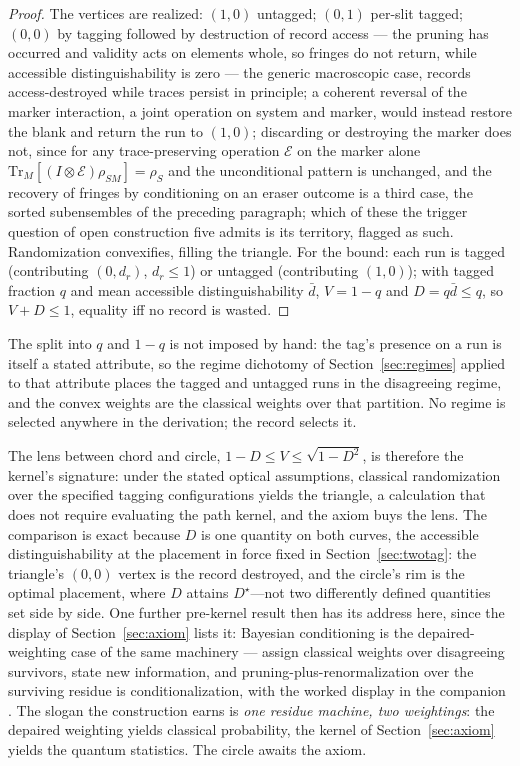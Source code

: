 \begin{proof}
The vertices are realized: $(1,0)$ untagged; $(0,1)$ per-slit tagged; $(0,0)$ by tagging followed by destruction of record access --- the pruning has occurred and validity acts on elements whole, so fringes do not return, while accessible distinguishability is zero --- the generic macroscopic case, records access-destroyed while traces persist in principle; a coherent reversal of the marker interaction, a joint operation on system and marker, would instead restore the blank and return the run to $(1,0)$; discarding or destroying the marker does not, since for any trace-preserving operation $\mathcal{E}$ on the marker alone $\mathrm{Tr}_M[(I \otimes \mathcal{E})\rho_{SM}] = \rho_S$ and the unconditional pattern is unchanged, and the recovery of fringes by conditioning on an eraser outcome is a third case, the sorted subensembles of the preceding paragraph; which of these the trigger question of open construction five admits is its territory, flagged as such. Randomization convexifies, filling the triangle. For the bound: each run is tagged (contributing $(0, d_r)$, $d_r \le 1$) or untagged (contributing $(1, 0)$); with tagged fraction $q$ and mean accessible distinguishability $\bar d$, $V = 1 - q$ and $D = q\bar d \le q$, so $V + D \le 1$, equality iff no record is wasted.
\end{proof}

\noindent The split into $q$ and $1-q$ is not imposed by hand: the tag's presence on a run is itself a stated attribute, so the regime dichotomy of Section~\ref{sec:regimes} applied to that attribute places the tagged and untagged runs in the disagreeing regime, and the convex weights are the classical weights over that partition. No regime is selected anywhere in the derivation; the record selects it.

\noindent The lens between chord and circle, $1 - D \le V \le \sqrt{1 - D^{2}}$, is therefore the kernel's signature: under the stated optical assumptions, classical randomization over the specified tagging configurations yields the triangle, a calculation that does not require evaluating the path kernel, and the axiom buys the lens. The comparison is exact because $D$ is one quantity on both curves, the accessible distinguishability at the placement in force fixed in Section~\ref{sec:twotag}: the triangle's $(0,0)$ vertex is the record destroyed, and the circle's rim is the optimal placement, where $D$ attains $D^{\star}$---not two differently defined quantities set side by side. One further pre-kernel result then has its address here, since the display of Section~\ref{sec:axiom} lists it: Bayesian conditioning is the depaired-weighting case of the same machinery --- assign classical weights over disagreeing survivors, state new information, and pruning-plus-renormalization over the surviving residue is conditionalization, with the worked display in the companion \cite{Aethus}. The slogan the construction earns is \emph{one residue machine, two weightings}: the depaired weighting yields classical probability, the kernel of Section~\ref{sec:axiom} yields the quantum statistics. The circle awaits the axiom.

